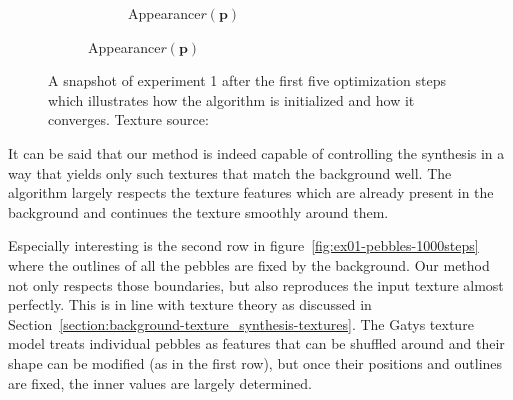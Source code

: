 \begin{figure}[]
\begin{subfigure}{\textwidth}
\begin{subfigure}{0.24\textwidth}
            \caption{Appearance\(r(\bm{p})\)}
            \label{fig:ex01-pebbles-5steps-threshold_proj}
        \end{subfigure}
    \end{subfigure}
    \caption{A snapshot of experiment 1 after the first five optimization steps which illustrates how the algorithm is initialized and how it converges. Texture source: \citet{Gatys2015}}
    \label{fig:ex01-pebbles-5steps}
\end{figure}

It can be said that our method is indeed capable of controlling the synthesis in a way that yields only such textures that match the background well. The algorithm largely respects the texture features which are already present in the background and continues the texture smoothly around them.

Especially interesting is the second row in figure~\ref{fig:ex01-pebbles-1000steps} where the outlines of all the pebbles are fixed by the background. Our method not only respects those boundaries, but also reproduces the input texture almost perfectly. This is in line with texture theory as discussed in Section~\ref{section:background-texture_synthesis-textures}. The Gatys texture model treats individual pebbles as features that can be shuffled around and their shape can be modified (as in the first row), but once their positions and outlines are fixed, the inner values are largely determined.

